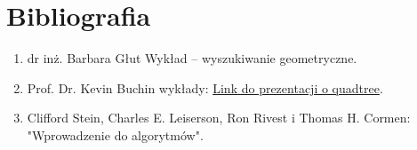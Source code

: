 \documentclass[11pt]{scrartcl}
\begin{document}
\section{Bibliografia}
\begin{enumerate}
    \item dr inż. Barbara Głut Wykład -- wyszukiwanie geometryczne.
    \item Prof. Dr. Kevin Buchin wykłady: \href{https://ls11-www.cs.tu-dortmund.de/_media/buchin/teaching/akda_ws21/quadtrees.pdf?fbclid=IwAR0CkjolTINnIw6dn0KZMarFhTsdrilv7pp6BOP6ctCmB5_mKtQgUV3gApw}{Link do prezentacji o quadtree}.
    \item Clifford Stein, Charles E. Leiserson, Ron Rivest i Thomas H. Cormen: "Wprowadzenie do algorytmów".

\end{enumerate}
\end{document}
